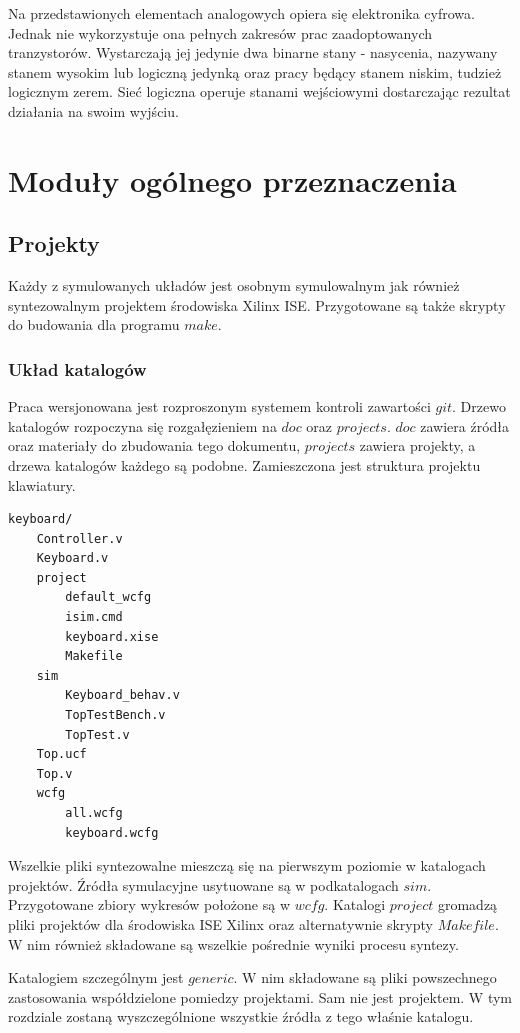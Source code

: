 \documentclass[a4paper,12pt]{article}
\begin{document}
Na przedstawionych elementach analogowych opiera się elektronika cyfrowa. Jednak nie wykorzystuje ona pełnych zakresów prac zaadoptowanych tranzystorów. Wystarczają jej jedynie dwa binarne stany - nasycenia, nazywany stanem wysokim lub logiczną jedynką oraz pracy będący stanem niskim, tudzież logicznym zerem. Sieć logiczna operuje stanami wejściowymi dostarczając rezultat działania na swoim wyjściu.


\newpage
\section{Moduły ogólnego przeznaczenia}

\subsection{Projekty}
Każdy z symulowanych układów jest osobnym symulowalnym jak również syntezowalnym projektem środowiska Xilinx ISE. Przygotowane są także skrypty do budowania dla programu $make$.

\subsubsection{Układ katalogów}
Praca wersjonowana jest rozproszonym systemem kontroli zawartości $git$. Drzewo katalogów rozpoczyna się rozgałęzieniem na $doc$ oraz $projects$. $doc$ zawiera źródła oraz materiały do zbudowania tego dokumentu, $projects$ zawiera projekty, a drzewa katalogów każdego są podobne. Zamieszczona jest struktura projektu klawiatury.

\begin{verbatim}
keyboard/
    Controller.v
    Keyboard.v
    project
        default_wcfg
        isim.cmd
        keyboard.xise
        Makefile
    sim
        Keyboard_behav.v
        TopTestBench.v
        TopTest.v
    Top.ucf
    Top.v
    wcfg
        all.wcfg
        keyboard.wcfg
\end{verbatim}

Wszelkie pliki syntezowalne mieszczą się na pierwszym poziomie w katalogach projektów. Źródła symulacyjne usytuowane są w podkatalogach $sim$. Przygotowane zbiory wykresów położone są w $wcfg$. Katalogi $project$ gromadzą pliki projektów dla środowiska ISE Xilinx oraz alternatywnie skrypty $Makefile$. W nim również składowane są wszelkie pośrednie wyniki procesu syntezy.

Katalogiem szczególnym jest $generic$. W nim składowane są pliki powszechnego zastosowania współdzielone pomiedzy projektami. Sam nie jest projektem. W tym rozdziale zostaną wyszczególnione wszystkie źródła z tego właśnie katalogu.
\end{document}
